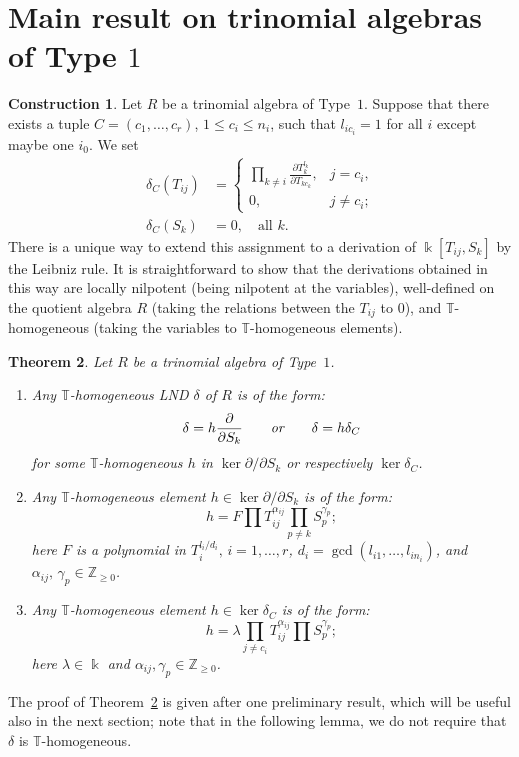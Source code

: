 \documentclass[a4paper,reqno,12pt]{amsart}
\theoremstyle{plain}
\newtheorem{theorem}{Theorem}[section]
\theoremstyle{definition}
\newtheorem{construction}[theorem]{Construction}
\theoremstyle{plain}
\theoremstyle{remark}
\newcommand{\TT}{\mathbb{T}}
\newcommand{\ZZ}{\mathbb Z}
\newcommand{\kk}{\Bbbk}
\begin{document}
\section{Main result on trinomial algebras of Type $1$}
\begin{construction}\label{ConstrDer1}
   Let $R$ be a trinomial algebra of Type~$1$. Suppose that there exists a tuple $C = (c_1, \ldots, c_r)$, $1\le c_i \le n_i$, such that $l_{ic_i}=1$ for all $i$ except maybe one $i_0$. We set
         \begin{equation*}
             \begin{split}
                 \delta_C(T_{ij}) &= \begin{cases}
                 \prod\limits_{k\neq i}\frac {\partial T_k^{l_k}}{\partial T_{kc_k}},&\text{$j=c_i$,}\\
                 0, &\text{$j \neq c_i$;}
                 \end{cases}\\
                 \delta_C(S_k) &= 0,\quad \text{all } k.
             \end{split}
         \end{equation*}
        There is a unique way to extend this assignment to a derivation of $\kk[T_{ij}, S_k]$ by the Leibniz rule. It is straightforward to show that the derivations obtained in this way are locally nilpotent (being nilpotent at the variables), well-defined on the quotient algebra $R$ (taking the relations between the $T_{ij}$ to $0$), and ${\TT}$-homogeneous (taking the variables to ${\TT}$-homogeneous elements). 
\end{construction}

\begin{theorem}\label{TheoremType1}
    Let $R$ be a trinomial algebra of Type~$1$.
    \begin{enumerate}
        \item [$(i)$] Any $\mathbb T$-homogeneous LND $\delta$ of $R$ is of the form: $$\delta=h{\partial\over\partial S_k} \qquad\textit{or}\qquad\delta=h\delta_C$$ 
    for some ${\TT}$-homogeneous $h$ in $\ker\partial/\partial S_k$ or respectively $\ker\delta_C$.
        \item [$(ii)$] Any ${\TT}$-homogeneous element $h\in\ker\partial/\partial S_k$ is of the form:     
        $$h=F\prod T_{ij}^{\alpha_{ij}}\prod\limits_{p\neq k} S_p^{\gamma_p};$$
        here $F$ is a polynomial in ${T_{i}^{l_{i}/d_i}}, \,i=1,\ldots,r$, $d_i=\gcd(l_{i1},\ldots,l_{in_i})$, and $\alpha_{ij},\,\gamma_p\in\ZZ_{\ge0}$.
        \item [$(iii)$] Any ${\TT}$-homogeneous element $h\in\ker\delta_C$ is of the form:
$$
    h=\lambda\prod\limits_{j\neq c_i} T_{ij}^{\alpha_{ij}}\prod S_p^{\gamma_p};
    $$
    here $\lambda\in\kk$ and $\alpha_{ij},\gamma_p\in\mathbb Z_{\ge0}$.
    \end{enumerate}        
\end{theorem}
The proof of Theorem~\ref{TheoremType1} is given after one preliminary result, which will be useful also in the next section; note that in the following lemma, we do not require that $\delta$ is ${\TT}$-homogeneous.
\end{document}
